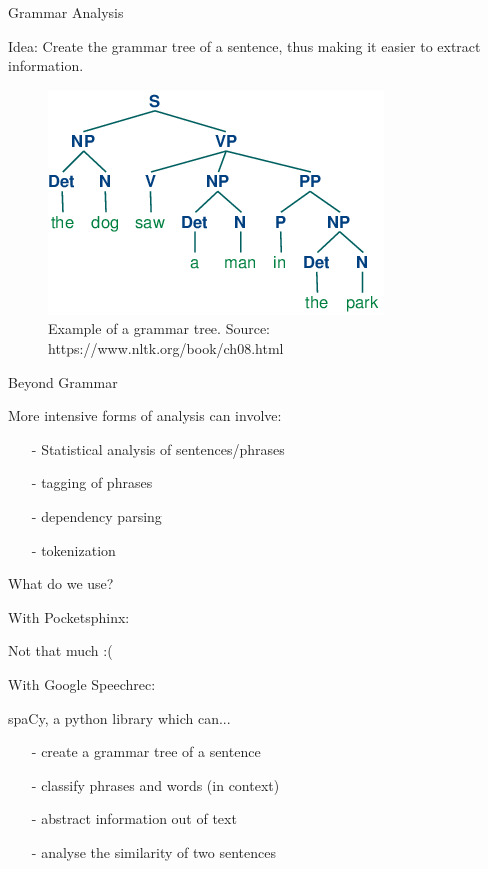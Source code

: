 \documentclass{beamer}
\begin{document}
	\begin{frame}{Grammar Analysis}
		\begin{alertblock}{Idea: Create the grammar tree of a sentence, thus making it easier to extract information.}
		\end{alertblock}
		
		\begin{figure}[ht]
			\centering
			\includegraphics[width=.7\linewidth]{Bilder/grammar_tree.png}
			\caption{Example of a grammar tree. Source: https://www.nltk.org/book/ch08.html}
		\end{figure}
		
	\end{frame}
	
	\begin{frame}{Beyond Grammar}
		\begin{alertblock}{More intensive forms of analysis can involve:}
			\begin{itemize}
				\item[-] Statistical analysis of sentences/phrases
				\item[-] tagging of phrases
				\item[-] dependency parsing
				\item[-] tokenization
			\end{itemize} 
		\end{alertblock}
	\end{frame}
	
	\begin{frame}{What do we use?}
		\begin{alertblock}{With Pocketsphinx:}
		
			\pause
			Not that much :(
		\end{alertblock}
		
		\begin{alertblock}{With Google Speechrec:}
		
			\pause
			spaCy, a python library which can...
			\begin{itemize}
				\item[-] create a grammar tree of a sentence
				\item[-] classify phrases and words (in context)
				\item[-] abstract information out of text
				\item[-] analyse the similarity of two sentences
			\end{itemize}
		\end{alertblock}
	\end{frame}
	
\end{document}
